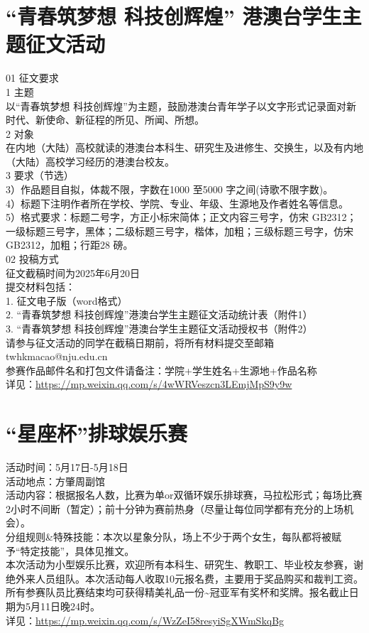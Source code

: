 \documentclass[letterpaper, 12pt]{article}
\begin{document}
\begin{multicols}{2}
\section{“青春筑梦想 科技创辉煌” 港澳台学生主题征文活动} %
01 征文要求
\\1 主题 
\\以“青春筑梦想 科技创辉煌”为主题，鼓励港澳台青年学子以文字形式记录面对新时代、新使命、新征程的所见、所闻、所想。
\\2 对象  
\\在内地（大陆）高校就读的港澳台本科生、研究生及进修生、交换生，以及有内地（大陆）高校学习经历的港澳台校友。
\\3 要求（节选）
\\3）作品题目自拟，体裁不限，字数在1000 至5000 字之间(诗歌不限字数)。
\\4）标题下注明作者所在学校、学院、专业、年级、生源地及作者姓名等信息。
\\5）格式要求：标题二号字，方正小标宋简体；正文内容三号字，仿宋 GB2312；一级标题三号字，黑体；二级标题三号字，楷体，加粗；三级标题三号字，仿宋 GB2312，加粗；行距28 磅。
\\02 投稿方式
\\征文截稿时间为2025年6月20日
\\提交材料包括：
\\1. 征文电子版（word格式）
\\2. “青春筑梦想 科技创辉煌”港澳台学⽣主题征⽂活动统计表（附件1）
\\3. “青春筑梦想 科技创辉煌”港澳台学⽣主题征⽂活动授权书（附件2）
\\请参与征文活动的同学在截稿日期前，将所有材料提交至邮箱twhkmacao@nju.edu.cn
\\参赛作品邮件名和打包文件请备注：学院+学生姓名+生源地+作品名称
\\详见：\url{https://mp.weixin.qq.com/s/4wWRVeszcn3LEmjMpS9y9w}

\section{“星座杯”排球娱乐赛} %
活动时间：5月17日-5月18日
\\活动地点：方肇周副馆
\\活动内容：根据报名人数，比赛为单or双循环娱乐排球赛，马拉松形式；每场比赛2小时不间断（暂定）；前十分钟为赛前热身（尽量让每位同学都有充分的上场机会）。
\\分组规则\&特殊技能：本次以星象分队，场上不少于两个女生，每队都将被赋予“特定技能”，具体见推文。
\\本次活动为小型娱乐比赛，欢迎所有本科生、研究生、教职工、毕业校友参赛，谢绝外来人员组队。本次活动每人收取10元报名费，主要用于奖品购买和裁判工资。所有参赛队员比赛结束均可获得精美礼品一份\textasciitilde{}冠亚军有奖杯和奖牌。报名截止日期为5月11日晚24时。
\\详见：\url{https://mp.weixin.qq.com/s/WzZeI58resyiSgXWmSkqBg}


\end{multicols}
\end{document}
